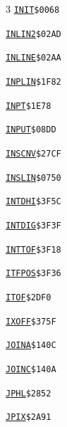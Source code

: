 \begin{multicols}{3}
\noindent\hyperlink{l:INIT}{\texttt{INIT}}\hfill\texttt{\$0068~\phantom{000}\llap{\pageref{l:INIT}}}\par
\noindent\hyperlink{l:INLIN2}{\texttt{INLIN2}}\hfill\texttt{\$02AD~\phantom{000}\llap{\pageref{l:INLIN2}}}\par
\noindent\hyperlink{l:INLINE}{\texttt{INLINE}}\hfill\texttt{\$02AA~\phantom{000}\llap{\pageref{l:INLINE}}}\par
\noindent\hyperlink{l:INPLIN}{\texttt{INPLIN}}\hfill\texttt{\$1F82~\phantom{000}\llap{\pageref{l:INPLIN}}}\par
\noindent\hyperlink{l:INPT}{\texttt{INPT}}\hfill\texttt{\$1E78~\phantom{000}\llap{\pageref{l:INPT}}}\par
\noindent\hyperlink{l:INPUT}{\texttt{INPUT}}\hfill\texttt{\$08DD~\phantom{000}\llap{\pageref{l:INPUT}}}\par
\noindent\hyperlink{l:INSCNV}{\texttt{INSCNV}}\hfill\texttt{\$27CF~\phantom{000}\llap{\pageref{l:INSCNV}}}\par
\noindent\hyperlink{l:INSLIN}{\texttt{INSLIN}}\hfill\texttt{\$0750~\phantom{000}\llap{\pageref{l:INSLIN}}}\par
\noindent\hyperlink{l:INTDHI}{\texttt{INTDHI}}\hfill\texttt{\$3F5C~\phantom{000}\llap{\pageref{l:INTDHI}}}\par
\noindent\hyperlink{l:INTDIG}{\texttt{INTDIG}}\hfill\texttt{\$3F3F~\phantom{000}\llap{\pageref{l:INTDIG}}}\par
\noindent\hyperlink{l:INTTOF}{\texttt{INTTOF}}\hfill\texttt{\$3F18~\phantom{000}\llap{\pageref{l:INTTOF}}}\par
\noindent\hyperlink{l:ITFPOS}{\texttt{ITFPOS}}\hfill\texttt{\$3F36~\phantom{000}\llap{\pageref{l:ITFPOS}}}\par
\noindent\hyperlink{l:ITOF}{\texttt{ITOF}}\hfill\texttt{\$2DF0~\phantom{000}\llap{\pageref{l:ITOF}}}\par
\noindent\hyperlink{l:IXOFF}{\texttt{IXOFF}}\hfill\texttt{\$375F~\phantom{000}\llap{\pageref{l:IXOFF}}}\par
\noindent\hyperlink{l:JOINA}{\texttt{JOINA}}\hfill\texttt{\$140C~\phantom{000}\llap{\pageref{l:JOINA}}}\par
\noindent\hyperlink{l:JOINC}{\texttt{JOINC}}\hfill\texttt{\$140A~\phantom{000}\llap{\pageref{l:JOINC}}}\par
\noindent\hyperlink{l:JPHL}{\texttt{JPHL}}\hfill\texttt{\$2852~\phantom{000}\llap{\pageref{l:JPHL}}}\par
\noindent\hyperlink{l:JPIX}{\texttt{JPIX}}\hfill\texttt{\$2A91~\phantom{000}\llap{\pageref{l:JPIX}}}\par

\end{multicols}
